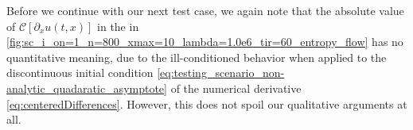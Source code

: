Before we continue with our next test case, we again note that the absolute value of $\mathcal{C} [\partial_x u ( t, x ) ]$ in the \ir{} in \cref{fig:sc_i_on=1_n=800_xmax=10_lambda=1.0e6_tir=60_entropy_flow} has no quantitative meaning, due to the ill-conditioned behavior when applied to the discontinuous initial condition \eqref{eq:testing_scenario_non-analytic_quadaratic_asymptote} of the numerical derivative \eqref{eq:centeredDifferences}. 
However, this does not spoil our qualitative arguments at all. 

\FloatBarrier
{}%
